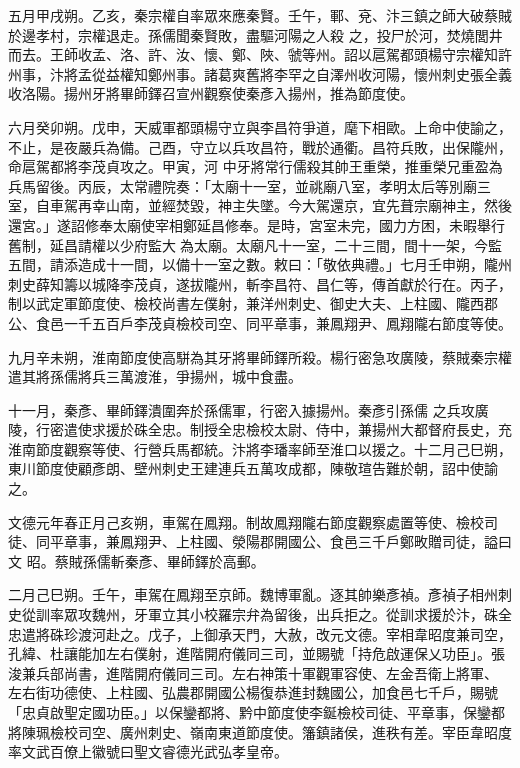 \begin{pinyinscope}
 五月甲戌朔。乙亥，秦宗權自率眾來應秦賢。壬午，鄆、兗、汴三鎮之師大破蔡賊於邊孝村，宗權退走。孫儒聞秦賢敗，盡驅河陽之人殺
 之，投尸於河，焚燒閭井而去。王師收孟、洛、許、汝、懷、鄭、陜、虢等州。詔以扈駕都頭楊守宗權知許州事，汴將孟從益權知鄭州事。諸葛爽舊將李罕之自澤州收河陽，懷州刺史張全義收洛陽。揚州牙將畢師鐸召宣州觀察使秦彥入揚州，推為節度使。



 六月癸卯朔。戊申，天威軍都頭楊守立與李昌符爭道，麾下相歐。上命中使諭之，不止，是夜嚴兵為備。己酉，守立以兵攻昌符，戰於通衢。昌符兵敗，出保隴州，命扈駕都將李茂貞攻之。甲寅，河
 中牙將常行儒殺其帥王重榮，推重榮兄重盈為兵馬留後。丙辰，太常禮院奏：「太廟十一室，並祧廟八室，孝明太后等別廟三室，自車駕再幸山南，並經焚毀，神主失墜。今大駕還京，宜先葺宗廟神主，然後還宮。」遂詔修奉太廟使宰相鄭延昌修奉。是時，宮室未完，國力方困，未暇舉行舊制，延昌請權以少府監大為太廟。太廟凡十一室，二十三間，間十一架，今監五間，請添造成十一間，以備十一室之數。敕曰：「敬依典禮。」七月壬申朔，隴州
 刺史薛知籌以城降李茂貞，遂拔隴州，斬李昌符、昌仁等，傳首獻於行在。丙子，制以武定軍節度使、檢校尚書左僕射，兼洋州刺史、御史大夫、上柱國、隴西郡公、食邑一千五百戶李茂貞檢校司空、同平章事，兼鳳翔尹、鳳翔隴右節度等使。



 九月辛未朔，淮南節度使高駢為其牙將畢師鐸所殺。楊行密急攻廣陵，蔡賊秦宗權遣其將孫儒將兵三萬渡淮，爭揚州，城中食盡。



 十一月，秦彥、畢師鐸潰圍奔於孫儒軍，行密入據揚州。秦彥引孫儒
 之兵攻廣陵，行密遣使求援於硃全忠。制授全忠檢校太尉、侍中，兼揚州大都督府長史，充淮南節度觀察等使、行營兵馬都統。汴將李璠率師至淮口以援之。十二月己巳朔，東川節度使顧彥朗、壁州刺史王建連兵五萬攻成都，陳敬瑄告難於朝，詔中使諭之。



 文德元年春正月己亥朔，車駕在鳳翔。制故鳳翔隴右節度觀察處置等使、檢校司徒、同平章事，兼鳳翔尹、上柱國、滎陽郡開國公、食邑三千戶鄭畋贈司徒，謚曰文
 昭。蔡賊孫儒斬秦彥、畢師鐸於高郵。



 二月己巳朔。壬午，車駕在鳳翔至京師。魏博軍亂。逐其帥樂彥禎。彥禎子相州刺史從訓率眾攻魏州，牙軍立其小校羅宗弁為留後，出兵拒之。從訓求援於汴，硃全忠遣將硃珍渡河赴之。戊子，上御承天門，大赦，改元文德。宰相韋昭度兼司空，孔緯、杜讓能加左右僕射，進階開府儀同三司，並賜號「持危啟運保乂功臣」。張浚兼兵部尚書，進階開府儀同三司。左右神策十軍觀軍容使、左金吾衛上將軍、
 左右街功德使、上柱國、弘農郡開國公楊復恭進封魏國公，加食邑七千戶，賜號「忠貞啟聖定國功臣。」以保鑾都將、黔中節度使李鋋檢校司徒、平章事，保鑾都將陳珮檢校司空、廣州刺史、嶺南東道節度使。籓鎮諸侯，進秩有差。宰臣韋昭度率文武百僚上徽號曰聖文睿德光武弘孝皇帝。




\end{pinyinscope}
